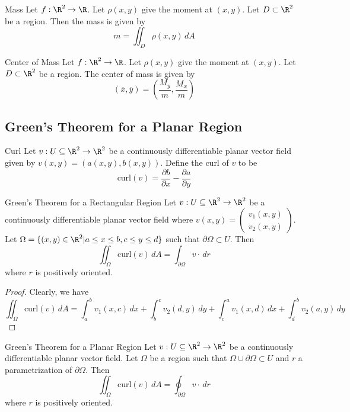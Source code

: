 \documentclass[a4paper]{article}
\begin{document}
\begin{thm}{Mass}{} Let $f:\R^2\to\R$. Let $\rho(x,y)$ give the moment at $(x,y)$. Let $D\subset\R^2$ be a region. Then the mass is given by $$m=\iint_D\rho(x,y)\,dA$$
\end{thm}

\begin{thm}{Center of Mass}{} Let $f:\R^2\to\R$. Let $\rho(x,y)$ give the moment at $(x,y)$. Let $D\subset\R^2$ be a region. The center of mass is given by $$(\overline{x},\overline{y})=\left(\frac{M_y}{m},\frac{M_x}{m}\right)$$
\end{thm}

\subsection{Green's Theorem for a Planar Region}
\begin{defn}{Curl}{} Let $v:U\subseteq\R^2\to\R^2$ be a continuously differentiable planar vector field given by $v(x,y)=\left(a(x,y),b(x,y)\right)$. Define the curl of $v$ to be $$\text{curl}(v)=\frac{\partial b}{\partial x}-\frac{\partial a}{\partial y}$$
\end{defn}

\begin{thm}{Green's Theorem for a Rectangular Region}{} Let $v:U\subseteq\R^2\to\R^2$ be a continuously differentiable planar vector field where $v(x,y)=\begin{pmatrix}v_1(x,y)\\v_2(x,y)\end{pmatrix}$. Let $\Omega=\{(x,y)\in\R^2|a\leq x\leq b,c\leq y\leq d\}$ such that $\partial\Omega\subset U$. Then $$\iint_\Omega\text{curl}(v)\,dA=\int_{\partial\Omega}v\cdot\,dr$$ where $r$ is positively oriented. \tcbline
\begin{proof}
Clearly, we have $$\iint_\Omega\text{curl}(v)\,dA=\int_a^bv_1(x,c)\,dx+\int_b^cv_2(d,y)\,dy+\int_c^av_1(x,d)\,dx+\int_d^bv_2(a,y)\,dy$$
\end{proof}
\end{thm}

\begin{thm}{Green's Theorem for a Planar Region}{} Let $v:U\subseteq\R^2\to\R^2$ be a continuously differentiable planar vector field. Let $\Omega$ be a region such that $\Omega\cup\partial\Omega\subset U$ and $r$ a parametrization of $\partial\Omega$. Then $$\iint_\Omega\text{curl}(v)\,dA=\oint_{\partial\Omega}v\cdot\,dr$$ where $r$ is positively oriented. 
\end{thm}
\end{document}
